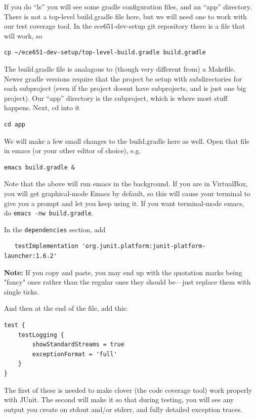 \documentclass[12pt]{article}
\begin{document}
If you do ``ls'' you will see some gradle configuration files,
and an ``app'' directory.  There is not a top-level build.gradle file
here, but we will need one to work with our test coverage tool.
In the ece651-dev-setup git repository there is a file that will work, so
\begin{verbatim}
cp ~/ece651-dev-setup/top-level-build.gradle build.gradle
\end{verbatim}

The build.gradle file is analagous to (though very different from) a Makefile.
Newer gradle versions require that the project be setup with subdirectories
for each subproject (even if the project doesnt have subprojects, and is just
one big project).   Our ``app'' directory is the subproject, which is where most
stuff happens. Next, cd into it

\begin{verbatim}
cd app
\end{verbatim}

We will make a few small changes to the build.gradle here as well.
Open that file in emacs (or your other editor of choice), e.g.

\begin{verbatim}
emacs build.gradle &
\end{verbatim}
Note that the above will run emacs in the background.  If you are in VirtualBox, you
will get graphical-mode Emacs by default, so this will cause your terminal to give you a prompt
and let you keep using it.  If you want terminal-mode emacs, do \verb+emacs -nw build.gradle+.

In the \verb+dependencies+ section, add
\begin{verbatim}
   testImplementation 'org.junit.platform:junit-platform-launcher:1.6.2'
\end{verbatim} 

\textbf{Note:} If you copy and paste, you may end up with the quotation marks being "fancy" ones rather
than the regular ones they should be---just replace them with single ticks.

And then at the end of the file, add this:
\begin{verbatim}
test {
    testLogging {
        showStandardStreams = true
        exceptionFormat = 'full'
    }
}
\end{verbatim}
The first of these is needed to make clover (the code coverage tool)
work properly with JUnit.  The second will make it so that  during testing,
you will see any output you create on stdout and/or stderr, and
fully detailed exception traces.
\end{document}
